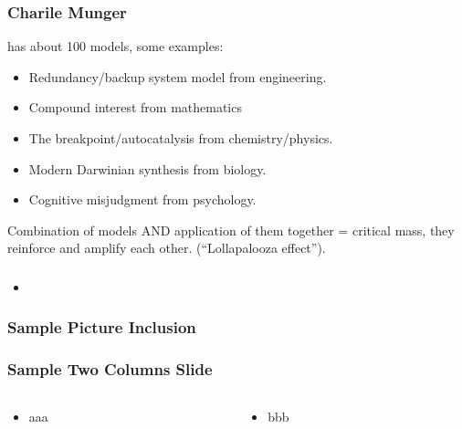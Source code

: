 \begin{frame}[fragile]\frametitle{Charile Munger}

has about 100 models, some examples:

\begin{itemize}
\item Redundancy/backup system model from engineering.
\item Compound interest from mathematics
\item The breakpoint/autocatalysis from chemistry/physics.
\item Modern Darwinian synthesis from biology.
\item Cognitive misjudgment from psychology.
\end{itemize}

Combination of models AND application of them together = critical mass, they reinforce and amplify each other. (“Lollapalooza effect”).

\end{frame}













\begin{frame}[fragile]\frametitle{}
\begin{itemize}
\item 
\end{itemize}
\end{frame}

\begin{frame}[fragile]\frametitle{Sample Picture Inclusion}

\end{frame}


\begin{frame}[fragile]\frametitle{Sample Two Columns Slide}
\begin{columns}
    \begin{column}[T]{0.6\linewidth}
      \begin{itemize}
		\item aaa
	  \end{itemize}

    \end{column}
    \begin{column}[T]{0.4\linewidth}
      \begin{itemize}
		\item bbb
	  \end{itemize}
    \end{column}
  \end{columns}
\end{frame}

